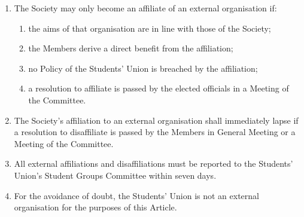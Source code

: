 \documentclass[12pt]{constitution}
\begin{document}

\label{article:affiliation-external-organisations}

\begin{enumerate}
    \item The Society may only become an affiliate of an external organisation if:
    \begin{enumerate}
        \item the aims of that organisation are in line with those of the Society;
        \item the Members derive a direct benefit from the affiliation;
        \item no Policy of the Students' Union is breached by the affiliation;
        \item a resolution to affiliate is passed by the elected officials in a Meeting of the Committee.
    \end{enumerate}

    \item The Society's affiliation to an external organisation shall immediately lapse if a resolution to disaffiliate is passed by the Members in General Meeting or a Meeting of the Committee.

    \item All external affiliations and disaffiliations must be reported to the Students' Union's Student Groups Committee within seven days.
    
    \item For the avoidance of doubt, the Students' Union is not an external organisation for the purposes of this Article.
\end{enumerate}


\label{article:amendment-constitution}
\end{document}
